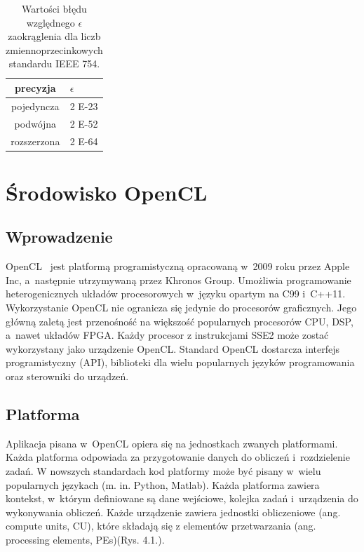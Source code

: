 \begin{table}[H]
        \centering
        \begin{threeparttable}
                \caption{Wartości błędu względnego $\epsilon$ zaokrąglenia dla liczb zmiennoprzecinkowych standardu IEEE 754.}\label{tab:table_exampleazd}
                \begin{tabularx}{0.6\textwidth}{| c | X |}
                        \midrule
                        	precyzja	& $\epsilon$  \\
		\midrule
		pojedyncza  &   2 E-23\\
                        podwójna  &   2 E-52\\
		rozszerzona &   2 E-64\\
                        \bottomrule
                \end{tabularx}
        \end{threeparttable}
\end{table}


\chapter{Środowisko OpenCL}\label{sec:OpenCL}

\section{Wprowadzenie}\label{sec:wprowadzenieope}

OpenCL~\cite{b21} jest platformą programistyczną opracowaną w~2009 roku przez Apple Inc, a~następnie utrzymywaną przez Khronos Group. Umożliwia programowanie heterogenicznych układów procesorowych w~języku opartym na C99 i~C++11. Wykorzystanie OpenCL nie ogranicza się jedynie do procesorów graficznych. Jego główną zaletą jest przenośność na większość popularnych procesorów CPU, DSP, a~nawet układów FPGA. Każdy procesor z instrukcjami SSE2 może zostać wykorzystany jako urządzenie OpenCL. Standard OpenCL dostarcza interfejs programistyczny (API), biblioteki dla wielu popularnych języków programowania oraz sterowniki do urządzeń.

\section{Platforma}\label{sec:platforma}

Aplikacja pisana w~OpenCL opiera się na jednostkach zwanych platformami. Każda platforma odpowiada za przygotowanie danych do obliczeń i~rozdzielenie zadań. W nowszych standardach kod platformy może być pisany w~wielu popularnych językach  (m. in. Python, Matlab). Każda platforma zawiera kontekst, w~którym definiowane są dane wejściowe, kolejka zadań i~urządzenia do wykonywania obliczeń. Każde urządzenie zawiera jednostki obliczeniowe (ang. compute units, CU), które składają się z elementów przetwarzania (ang. processing elements, PEs)(Rys. 4.1.). 

